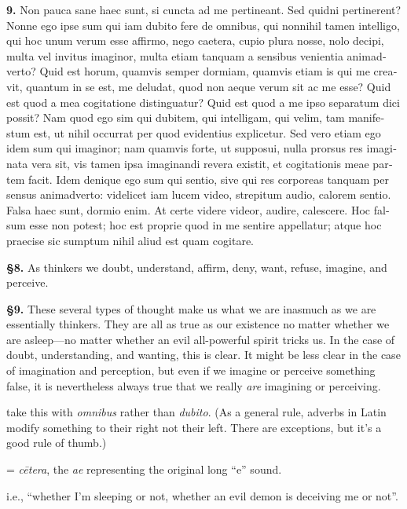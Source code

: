 \beginnumbering
\pstart
\begin{latin}
    \textenglish{\textbf{9.}} Non pauca sane haec sunt, si cuncta ad me pertineant. Sed quidni pertinerent? Nonne ego ipse sum qui iam dubito fere de omnibus, qui nonnihil tamen intelligo, qui hoc unum verum esse affirmo, nego caetera, cupio plura nosse, nolo decipi, multa vel invitus imaginor, multa etiam tanquam a sensibus venientia animadverto? Quid est horum, quamvis semper dormiam, quamvis etiam is qui me creavit, quantum in se est, me deludat, quod non aeque verum sit ac me esse? Quid est quod a mea cogitatione distinguatur? Quid est quod a me ipso separatum dici possit? Nam quod ego sim qui dubitem, qui intelligam, qui velim, tam manifestum est, ut nihil occurrat per quod evidentius explicetur. Sed vero etiam ego idem sum qui imaginor; nam quamvis forte, ut supposui, nulla prorsus res imaginata vera sit, vis tamen ipsa imaginandi revera existit, et cogitationis meae partem facit. Idem denique ego sum qui sentio, sive qui res corporeas tanquam per sensus animadverto: videlicet iam lucem video, strepitum audio, calorem sentio. Falsa haec sunt, dormio enim. At certe videre videor, audire, calescere. Hoc falsum esse non potest; hoc est proprie quod in me sentire appellatur; atque hoc praecise sic sumptum nihil aliud est quam cogitare.
\end{latin}
\pend
\endnumbering

\prenotes

\textbf{§8.} As thinkers we doubt, understand, affirm, deny, want, refuse, imagine, and perceive.

\textbf{§9.} These several types of thought make us what we are inasmuch as we are essentially thinkers. They are all as true as our existence no matter whether we are asleep---no matter whether an evil all-powerful spirit tricks us. In the case of doubt, understanding, and wanting, this is clear. It might be less clear in the case of imagination and perception, but even if we imagine or perceive something false, it is nevertheless always true that we really \textit{are} imagining or perceiving.

 take this with \textit{omnibus} rather than \textit{dubito}. (As a general rule, adverbs in Latin modify something to their right not their left. There are exceptions, but it's a good rule of thumb.)

 = \textit{cētera}, the \textit{ae} representing the original long ``e'' sound.

 i.e., ``whether I'm sleeping or not, whether an evil demon is deceiving me or not''.

